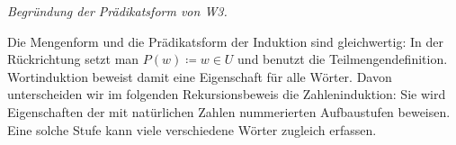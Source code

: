 \noindent\textit{Begründung der Prädikatsform von W3.}
\begin{tabproofwide}
\end{tabproofwide}


Die Mengenform und die Prädikatsform der Induktion sind gleichwertig:
In der Rückrichtung setzt man \(P(w)\coloneqq w\in U\) und benutzt
die Teilmengendefinition. Wortinduktion beweist damit eine Eigenschaft
für alle Wörter. Davon unterscheiden wir im folgenden Rekursionsbeweis
die Zahleninduktion: Sie wird Eigenschaften der mit natürlichen Zahlen
nummerierten Aufbaustufen beweisen. Eine solche Stufe kann viele
verschiedene Wörter zugleich erfassen.


